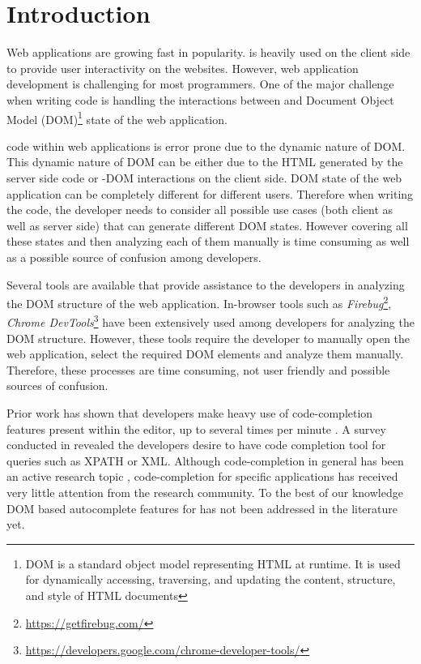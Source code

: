 \section{Introduction}
\label{Sec:Introduction}

Web applications are growing fast in popularity. \javascript is heavily used on the client side to provide user interactivity on the websites. However, web application development is challenging for most programmers. One of the major challenge when writing \javascript code is handling the interactions between \javascript and Document Object Model (DOM)\footnote{DOM is a standard object model representing HTML at runtime. It is used for dynamically accessing, traversing, and updating the content, structure, and style of HTML documents} state of the web application\cite{ocariza2013empirical}.


\javascript code within web applications is error prone due to the dynamic nature of DOM. This dynamic nature of DOM can be either due to the HTML generated by the server side code or \javascript-DOM interactions on the client side. DOM state of the web application can be completely different for different users. Therefore when writing the \javascript code, the developer needs to consider all possible use cases (both client as well as server side) that can generate different DOM states. However covering all these states and then analyzing each of them manually is time consuming as well as a possible source of confusion among developers. 


Several tools are available that provide assistance to the developers in analyzing the DOM structure of the web application. In-browser tools such as \emph{Firebug}\footnote{\url{https://getfirebug.com/}}, \emph{Chrome DevTools}\footnote{\url{https://developers.google.com/chrome-developer-tools/}} have been extensively used among developers for analyzing the DOM structure. However, these tools require the developer to manually open the web application, select the required DOM elements and analyze them manually. Therefore, these processes are time consuming, not user friendly and possible sources of confusion.

Prior work \cite{murphy2006java} has shown that developers make heavy use of code-completion features present within the editor, up to several times per minute . A survey conducted in \cite{omar2012active} revealed the developers desire to have code completion tool for queries such as XPATH or XML. Although code-completion in general has been an active research topic \cite{robbes2008program, lee2008towards, han2009code, bruch2009learning, brandt2010example, mooty2010calcite, hou2011evaluation}, code-completion for \javascript specific applications has received very little attention from the research community. To the best of our knowledge DOM based autocomplete features for \javascript has not been addressed in the literature yet.


